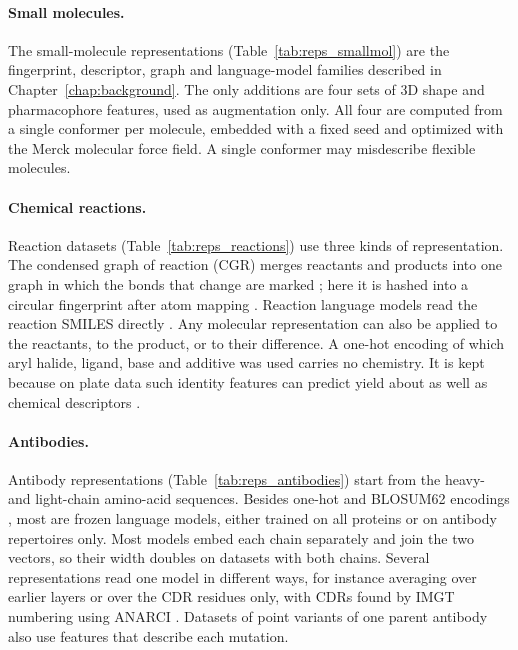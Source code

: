 \paragraph{Small molecules.} The small-molecule representations (Table~\ref{tab:reps_smallmol}) are the fingerprint, descriptor, graph and language-model families described in Chapter~\ref{chap:background}. The only additions are four sets of 3D shape and pharmacophore features, used as augmentation only. All four are computed from a single conformer per molecule, embedded with a fixed seed and optimized with the Merck molecular force field. A single conformer may misdescribe flexible molecules.

\paragraph{Chemical reactions.} Reaction datasets (Table~\ref{tab:reps_reactions}) use three kinds of representation. The condensed graph of reaction (CGR) merges reactants and products into one graph in which the bonds that change are marked \citep{Hoonakker2011}; here it is hashed into a circular fingerprint after atom mapping \citep{Schwaller2021rxnmapper}. Reaction language models read the reaction SMILES directly \citep{Schwaller2021rxnfp, Sagawa2023ReactionT5}. Any molecular representation can also be applied to the reactants, to the product, or to their difference. A one-hot encoding of which aryl halide, ligand, base and additive was used carries no chemistry. It is kept because on plate data such identity features can predict yield about as well as chemical descriptors \citep{Chuang2018}.

\paragraph{Antibodies.} Antibody representations (Table~\ref{tab:reps_antibodies}) start from the heavy- and light-chain amino-acid sequences. Besides one-hot and BLOSUM62 encodings \citep{Henikoff1992}, most are frozen language models, either trained on all proteins or on antibody repertoires only. Most models embed each chain separately and join the two vectors, so their width doubles on datasets with both chains. Several representations read one model in different ways, for instance averaging over earlier layers or over the CDR residues only, with CDRs found by IMGT numbering \citep{Lefranc2003} using ANARCI \citep{Dunbar2016ANARCI}. Datasets of point variants of one parent antibody also use features that describe each mutation.

